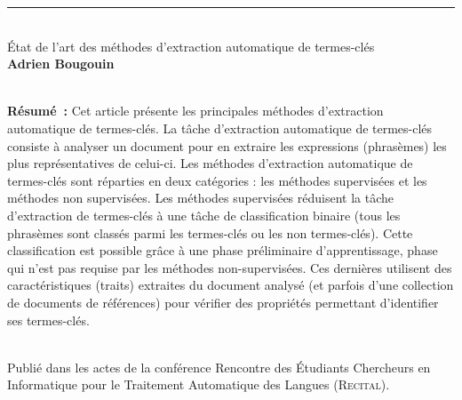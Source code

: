   \vspace{2.5em}\hrule\vspace{2.5em}

  ~\\État de l'art des méthodes d'extraction automatique de
  termes-clés\\\textbf{Adrien Bougouin}\\\cite{bougouin2013stateoftheart}

  ~\\\textbf{Résumé~:}
  Cet article présente les principales méthodes d'extraction automatique de
  termes-clés. La tâche d'extraction automatique de termes-clés consiste à
  analyser un document pour en extraire les expressions (phrasèmes) les plus
  représentatives de celui-ci. Les méthodes d'extraction automatique de
  termes-clés sont réparties en deux catégories : les méthodes supervisées et
  les méthodes non supervisées. Les méthodes supervisées réduisent la tâche
  d'extraction de termes-clés à une tâche de classification binaire (tous les
  phrasèmes sont classés parmi les termes-clés ou les non termes-clés). Cette
  classification est possible grâce à une phase préliminaire d'apprentissage,
  phase qui n'est pas requise par les méthodes non-supervisées. Ces dernières
  utilisent des caractéristiques (traits) extraites du document analysé (et
  parfois d'une collection de documents de références) pour vérifier des
  propriétés permettant d'identifier ses termes-clés.

  ~\\Publié dans les actes de la conférence Rencontre des Étudiants Chercheurs en
  Informatique pour le Traitement Automatique des Langues (\textsc{Recital}).
